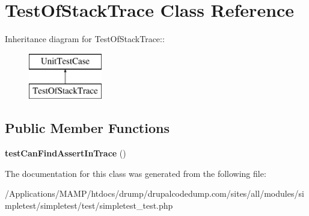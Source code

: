 \hypertarget{class_test_of_stack_trace}{
\section{TestOfStackTrace Class Reference}
\label{class_test_of_stack_trace}
}
Inheritance diagram for TestOfStackTrace::\begin{figure}[H]
\begin{center}
\leavevmode
\includegraphics[height=2cm]{class_test_of_stack_trace}
\end{center}
\end{figure}
\subsection*{Public Member Functions}
\begin{DoxyCompactItemize}
\item 
\hypertarget{class_test_of_stack_trace_aad2ebeddabb594323703ddff6e543400}{
{\bfseries testCanFindAssertInTrace} ()}
\label{class_test_of_stack_trace_aad2ebeddabb594323703ddff6e543400}

\end{DoxyCompactItemize}


The documentation for this class was generated from the following file:\begin{DoxyCompactItemize}
\item 
/Applications/MAMP/htdocs/drump/drupalcodedump.com/sites/all/modules/simpletest/simpletest/test/simpletest\_\-test.php\end{DoxyCompactItemize}
